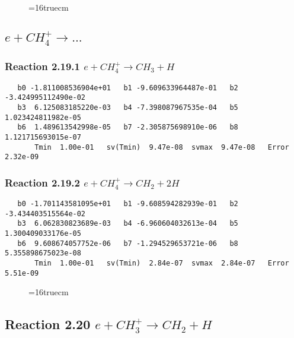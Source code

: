 \documentclass[12pt]{article}
\begin{document}
\begin{figure} \label{met.2_2.18}
\epsfxsize=16truecm
\end{figure}
\newpage
 
\subsection{ 
$e + CH_4^+ \rightarrow ... $
}
 
\subsubsection{
Reaction 2.19.1    $e + CH_4^+ \rightarrow CH_3 + H$
}

\begin{small}\begin{verbatim} 
   b0 -1.811008536904e+01   b1 -9.609633964487e-01   b2 -3.424995112490e-02
   b3  6.125083185220e-03   b4 -7.398087967535e-04   b5  1.023424811982e-05
   b6  1.489613542998e-05   b7 -2.305875698910e-06   b8  1.121715693015e-07
       Tmin  1.00e-01   sv(Tmin)  9.47e-08  svmax  9.47e-08   Error  2.32e-09
\end{verbatim}\end{small}

\subsubsection{
Reaction 2.19.2    $e + CH_4^+ \rightarrow CH_2 + 2H$
}

\begin{small}\begin{verbatim} 
   b0 -1.701143581095e+01   b1 -9.608594282939e-01   b2 -3.434403515564e-02
   b3  6.062830823689e-03   b4 -6.960604032613e-04   b5  1.300409033176e-05
   b6  9.608674057752e-06   b7 -1.294529653721e-06   b8  5.355898675023e-08
       Tmin  1.00e-01   sv(Tmin)  2.84e-07  svmax  2.84e-07   Error  5.51e-09
\end{verbatim}\end{small}

\begin{figure} \label{met.2_2.19}
\epsfxsize=16truecm
\end{figure}
\newpage
 
\subsection{ 
Reaction 2.20     $e + CH_3^+ \rightarrow CH_2 + H$
}
\end{document}
